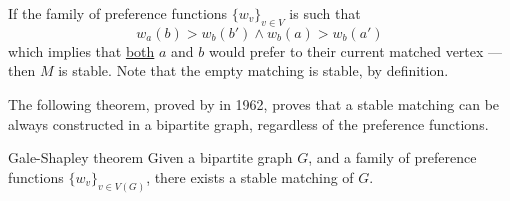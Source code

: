 \documentclass[a4paper, 12pt]{report}
\begin{document}
    If the family of preference functions $\{w_v\}_{v \in V}$ is such that $$w_a(b) > w_b(b') \land w_b(a) > w_b(a')$$ which implies that \underline{both} $a$ and $b$ would prefer to  their current matched vertex --- then $M$ is  stable. Note that the empty matching is  stable, by definition.

    The following theorem, proved by \textcite{gale} in 1962, proves that a stable matching can be always constructed in a bipartite graph, regardless of the preference functions.

    \begin{framedthm}{Gale-Shapley theorem}
        Given a bipartite graph $G$, and a family of preference functions $\{w_v\}_{v \in V(G)}$, there exists a stable matching of $G$.
    \end{framedthm}
\end{document}
